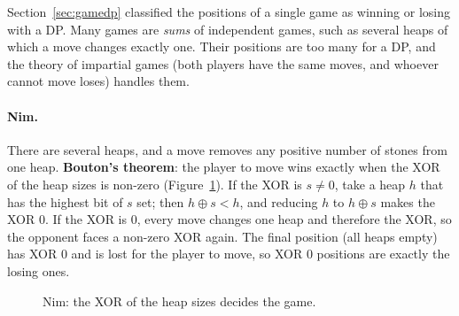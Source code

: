 Section~\ref{sec:gamedp} classified the positions of a single game as winning or losing with a DP. Many games are \emph{sums} of
independent games, such as several heaps of which a move changes exactly one. Their positions are too many for a DP, and the theory of
impartial games (both players have the same moves, and whoever cannot move loses) handles them.

\paragraph{Nim.} There are several heaps, and a move removes any positive number of stones from one heap. \textbf{Bouton's theorem}:
the player to move wins exactly when the XOR of the heap sizes is non-zero (Figure~\ref{fig:nim}). If the XOR is $s \ne 0$, take a heap
$h$ that has the highest bit of $s$ set; then $h \oplus s < h$, and reducing $h$ to $h \oplus s$ makes the XOR 0. If the XOR is 0, every
move changes one heap and therefore the XOR, so the opponent faces a non-zero XOR again. The final position (all heaps empty) has
XOR 0 and is lost for the player to move, so XOR 0 positions are exactly the losing ones.

\begin{figure}[htbp]
\centering
{}
\caption{Nim: the XOR of the heap sizes decides the game.}
\label{fig:nim}
\end{figure}

